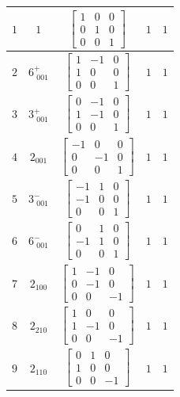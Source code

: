 \documentclass[fleqn,8pt]{jsarticle}
\begin{document}
\begin{longtable}{ccccc}
$ 1 $ & $ 1 $ & $ \begin{bmatrix} 1 & 0 & 0 \\ 0 & 1 & 0 \\ 0 & 0 & 1 \end{bmatrix} $ & $ 1 $ & $ 1 $ \\ \hline
$ 2 $ & $ 6^{+}_{\,\,001} $ & $ \begin{bmatrix} 1 & -1 & 0 \\ 1 & 0 & 0 \\ 0 & 0 & 1 \end{bmatrix} $ & $ 1 $ & $ 1 $ \\ \hline
$ 3 $ & $ 3^{+}_{\,\,001} $ & $ \begin{bmatrix} 0 & -1 & 0 \\ 1 & -1 & 0 \\ 0 & 0 & 1 \end{bmatrix} $ & $ 1 $ & $ 1 $ \\ \hline
$ 4 $ & $ 2{}_{001} $ & $ \begin{bmatrix} -1 & 0 & 0 \\ 0 & -1 & 0 \\ 0 & 0 & 1 \end{bmatrix} $ & $ 1 $ & $ 1 $ \\ \hline
$ 5 $ & $ 3^{-}_{\,\,001} $ & $ \begin{bmatrix} -1 & 1 & 0 \\ -1 & 0 & 0 \\ 0 & 0 & 1 \end{bmatrix} $ & $ 1 $ & $ 1 $ \\ \hline
$ 6 $ & $ 6^{-}_{\,\,001} $ & $ \begin{bmatrix} 0 & 1 & 0 \\ -1 & 1 & 0 \\ 0 & 0 & 1 \end{bmatrix} $ & $ 1 $ & $ 1 $ \\ \hline
$ 7 $ & $ 2{}_{100} $ & $ \begin{bmatrix} 1 & -1 & 0 \\ 0 & -1 & 0 \\ 0 & 0 & -1 \end{bmatrix} $ & $ 1 $ & $ 1 $ \\ \hline
$ 8 $ & $ 2{}_{210} $ & $ \begin{bmatrix} 1 & 0 & 0 \\ 1 & -1 & 0 \\ 0 & 0 & -1 \end{bmatrix} $ & $ 1 $ & $ 1 $ \\ \hline
$ 9 $ & $ 2{}_{110} $ & $ \begin{bmatrix} 0 & 1 & 0 \\ 1 & 0 & 0 \\ 0 & 0 & -1 \end{bmatrix} $ & $ 1 $ & $ 1 $ \\ \hline

\end{longtable}
\end{document}
